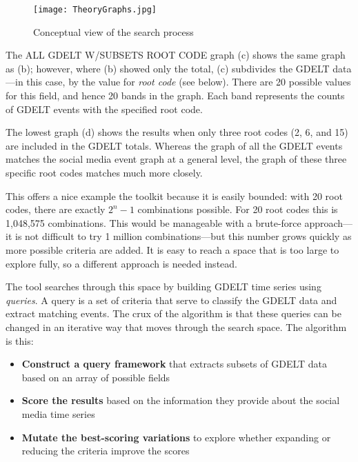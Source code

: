 \begin{figure}
[htbp] \texttt{[image: TheoryGraphs.jpg]}
\caption{Conceptual view of the search process} 
\label{FourGraphsFigure} 
\end{figure}

\par The ALL GDELT W/SUBSETS ROOT CODE graph (c) shows the same graph as (b); however, where (b) showed only the total, (c) subdivides the GDELT data---in this case, by the value for \textit{root code} (see below). There are 20 possible values for this field, and hence 20 bands in the graph. Each band represents the counts of GDELT events with the specified root code. 

\par The lowest graph (d) shows the results when only three root codes (2, 6, and 15) are included in the GDELT totals. Whereas the graph of all the GDELT events matches the social media event graph at a general level, the graph of these three specific root codes matches much more closely. 

\par This offers a nice example the \gdgas toolkit because it is easily bounded: with 20 root codes, there are exactly ${2^n - 1}$ combinations possible. For 20 root codes this is 1,048,575 combinations. This would be manageable with a brute-force approach---it is not difficult to try 1 million combinations---but this number grows quickly as more possible criteria are added. It is easy to reach a space that is too large to explore fully, so a different approach is needed instead.

\par The \gdgas tool searches through this space by building GDELT time series using \textit{queries}. A query is a set of criteria that serve to classify the GDELT data and extract matching events. The crux of the \gdgas algorithm is that these queries can be changed in an iterative way that moves through the search space. The algorithm is this:

\begin{itemize} 
	\item \textbf{Construct a query framework} that extracts subsets of GDELT data based on an array of possible fields 
	\item \textbf{Score the results} based on the information they provide about the social media time series
	\item \textbf{Mutate the best-scoring variations} to explore whether expanding or reducing the criteria improve the scores
\end{itemize}


